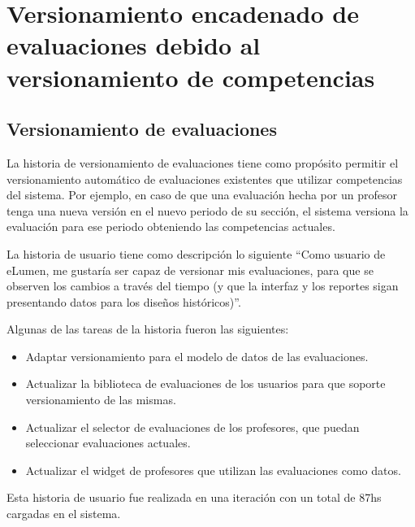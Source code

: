 \section{Versionamiento encadenado de evaluaciones debido al versionamiento de competencias}
\subsection{Versionamiento de evaluaciones}
La historia de versionamiento de evaluaciones tiene como propósito permitir el versionamiento automático de evaluaciones existentes que utilizar competencias del sistema. Por ejemplo, en caso de que una evaluación hecha por un profesor tenga una nueva versión en el nuevo periodo de su sección, el sistema versiona la evaluación para ese periodo obteniendo las competencias actuales.

La historia de usuario tiene como descripción lo siguiente \enquote{Como usuario de eLumen, me gustaría ser capaz de versionar mis evaluaciones, para que se observen los cambios a través del tiempo (y que la interfaz y los reportes sigan presentando datos para los diseños históricos)}.

Algunas de las tareas de la historia fueron las siguientes:
\begin{itemize}
	\item Adaptar versionamiento para el modelo de datos de las evaluaciones.
	\item Actualizar la biblioteca de evaluaciones de los usuarios para que soporte versionamiento de las mismas.
	\item Actualizar el selector de evaluaciones de los profesores, que puedan seleccionar evaluaciones actuales.
	\item Actualizar el widget de profesores que utilizan las evaluaciones como datos.
\end{itemize}

Esta historia de usuario fue realizada en una iteración con un total de 87hs cargadas en el sistema.
